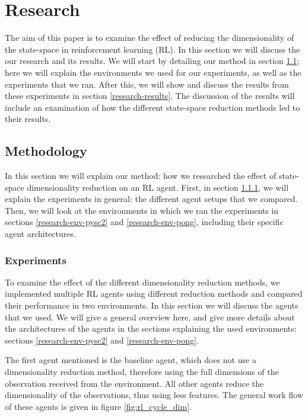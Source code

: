 \chapter{Research}\label{research}
The aim of this paper is to examine the effect of reducing the dimensionality of the state-space in reinforcement learning (RL). In this section we will discuss the our research and its results. We will start by detailing our method in section \ref{research-method}; here we will explain the environments we used for our experiments, as well as the experiments that we ran. After this, we will show and discuss the results from these experiments in section \ref{research-results}. The discussion of the results will include an examination of how the different state-space reduction methods led to their results.

\section{Methodology}\label{research-method}
In this section we will explain our method: how we researched the effect of state-space dimensionality reduction on an RL agent. First, in section \ref{research-exp}, we will explain the experiments in general: the different agent setups that we compared. Then, we will look at the environments in which we ran the experiments in sections \ref{research-env-pysc2} and \ref{research-env-pong}, including their specific agent architectures.

\subsection{Experiments}\label{research-exp}
To examine the effect of the different dimensionality reduction methods, we implemented multiple RL agents using different reduction methods and compared their performance in two environments. In this section we will discuss the agents that we used. We will give a general overview here, and give more details about the architectures of the agents in the sections explaining the used environments: sections \ref{research-env-pysc2} and \ref{research-env-pong}.

The first agent mentioned is the baseline agent, which does not use a dimensionality reduction method, therefore using the full dimensions of the observation received from the environment. All other agents reduce the dimensionality of the observations, thus using less features. The general work flow of these agents is given in figure \ref{fig:rl_cycle_dim}.

